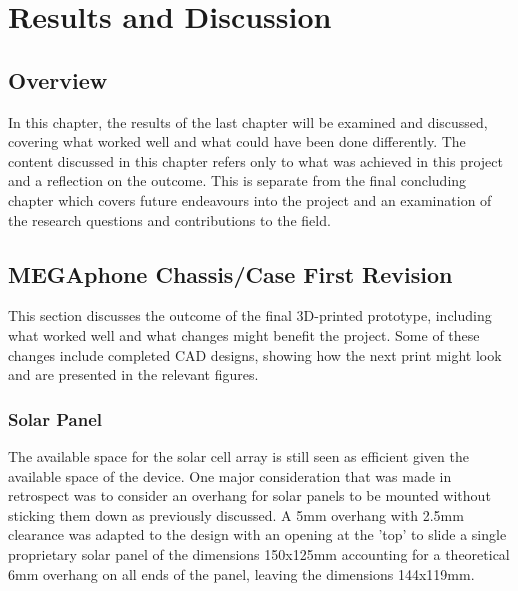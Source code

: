 
\chapter{Results and Discussion} %

\label{Chapter5} %


\section{Overview}
In this chapter, the results of the last chapter will be examined and discussed, covering what worked well and what could have been done differently.
The content discussed in this chapter refers only to what was achieved in this project and a reflection on the outcome.
This is separate from the final concluding chapter which covers future endeavours into the project and an examination of the research questions and contributions to the field.


\section{MEGAphone Chassis/Case First Revision}
This section discusses the outcome of the final 3D-printed prototype, including what worked well and what changes might benefit the project.
Some of these changes include completed CAD designs, showing how the next print might look and are presented in the relevant figures.

\subsection{Solar Panel}

The available space for the solar cell array is still seen as efficient given the available space of the device.
One major consideration that was made in retrospect was to consider an overhang for solar panels to be mounted without sticking them down as previously discussed.
A 5mm overhang with 2.5mm clearance was adapted to the design with an opening at the 'top' to slide a single proprietary solar panel of the dimensions 150x125mm accounting for a theoretical 6mm overhang on all ends of the panel, leaving the dimensions 144x119mm.

